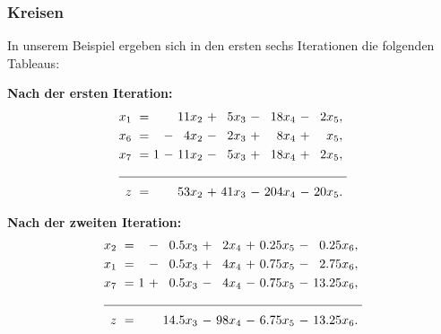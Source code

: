 \documentclass[smaller]{beamer}
\begin{document}
\begin{frame}
 \frametitle{Kreisen}
 In unserem Beispiel ergeben sich in den ersten sechs Iterationen die folgenden Tableaus:
 
 \textbf{Nach der ersten Iteration:}
\begin{align*}
\begin{alignedat}{6}
x_1 &\ = &\     &\   &\ 11x_2 &\ + &\  5x_3 &\ - &\  18x_4 &\ - &\  2x_5,\ \\
x_6 &\ = &\     &\ - &\  4x_2 &\ - &\  2x_3 &\ + &\   8x_4 &\ + &\   x_5,\ \\
x_7 &\ = &\   1 &\ - &\ 11x_2 &\ - &\  5x_3 &\ + &\  18x_4 &\ + &\  2x_5,\ \\ \cline{1-11}
z   &\ = &\     &\   &\ 53x_2 &\ + &\ 41x_3 &\ - &\ 204x_4 &\ - &\ 20x_5.\
\end{alignedat}
\end{align*}

\textbf{Nach der zweiten Iteration:}
\begin{align*}
\begin{alignedat}{6}
x_2 &\ = &\     &\ - &\  0.5x_3 &\ + &\  2x_4 &\ + &\ 0.25x_5 &\ - &\  0.25x_6,\ \\
x_1 &\ = &\     &\ - &\  0.5x_3 &\ + &\  4x_4 &\ + &\ 0.75x_5 &\ - &\  2.75x_6,\ \\
x_7 &\ = &\   1 &\ + &\  0.5x_3 &\ - &\  4x_4 &\ - &\ 0.75x_5 &\ - &\ 13.25x_6,\ \\ \cline{1-11}
z   &\ = &\     &\   &\ 14.5x_3 &\ - &\ 98x_4 &\ - &\ 6.75x_5 &\ - &\ 13.25x_6.\
\end{alignedat}
\end{align*}
\end{frame}
\end{document}
